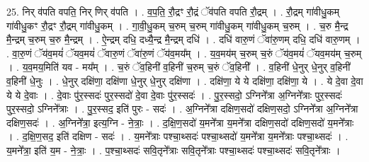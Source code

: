 \documentclass[17pt]{extarticle}
\begin{document}
25. निर् व॑पति वपति॒ निर् णिर् व॑पति । . व॒प॒ति॒ रौ॒द्रꣳ रौ॒द्रं ॅव॑पति वपति रौ॒द्रम् । . रौ॒द्रम् गा॑वीधु॒कम् गा॑वीधु॒कꣳ रौ॒द्रꣳ रौ॒द्रम् गा॑वीधु॒कम् । . गा॒वी॒धु॒कम् च॒रुम् च॒रुम् गा॑वीधु॒कम् गा॑वीधु॒कम् च॒रुम् । . च॒रु मै॒न्द्र मै॒न्द्रम् च॒रुम् च॒रु मै॒न्द्रम् । . ऐ॒न्द्रम् दधि॒ दध्यै॒न्द्र मै॒न्द्रम् दधि॑ । . दधि॑ वारु॒णं ॅवा॑रु॒णम् दधि॒ दधि॑ वारु॒णम् । . वा॒रु॒णं ॅय॑व॒मयं॑ ॅयव॒मयं॑ ॅवारु॒णं ॅवा॑रु॒णं ॅय॑व॒मय᳚म् । . य॒व॒मय॑म् च॒रुम् च॒रुं ॅय॑व॒मयं॑ ॅयव॒मय॑म् च॒रुम् । . य॒व॒मय॒मिति॑ यव - मय᳚म् । . च॒रुं ॅव॒हिनी॑ व॒हिनी॑ च॒रुम् च॒रुं ॅव॒हिनी᳚ । . व॒हिनी॑ धे॒नुर् धे॒नुर् व॒हिनी॑ व॒हिनी॑ धे॒नुः । . धे॒नुर् दक्षि॑णा॒ दक्षि॑णा धे॒नुर् धे॒नुर् दक्षि॑णा । . दक्षि॑णा॒ ये ये दक्षि॑णा॒ दक्षि॑णा॒ ये । . ये दे॒वा दे॒वा ये ये दे॒वाः । . दे॒वाः पु॑र॒स्सदः॑ पुर॒स्सदो॑ दे॒वा दे॒वाः पु॑र॒स्सदः॑ । . पु॒र॒स्सदो॒ ऽग्निने᳚त्रा अ॒ग्निने᳚त्राः पुर॒स्सदः॑ पुर॒स्सदो॒ ऽग्निने᳚त्राः । . पु॒र॒स्सद॒ इति॑ पुरः - सदः॑ । . अ॒ग्निने᳚त्रा दक्षिण॒सदो॑ दक्षिण॒सदो॒ ऽग्निने᳚त्रा अ॒ग्निने᳚त्रा दक्षिण॒सदः॑ । . अ॒ग्निने᳚त्रा॒ इत्य॒ग्नि - ने॒त्राः॒ । . द॒क्षि॒ण॒सदो॑ य॒मने᳚त्रा य॒मने᳚त्रा दक्षिण॒सदो॑ दक्षिण॒सदो॑ य॒मने᳚त्राः । . द॒क्षि॒ण॒सद॒ इति॑ दक्षिण - सदः॑ । . य॒मने᳚त्राः पश्चा॒थ्सदः॑ पश्चा॒थ्सदो॑ य॒मने᳚त्रा य॒मने᳚त्राः पश्चा॒थ्सदः॑ । . य॒मने᳚त्रा॒ इति॑ य॒म - ने॒त्राः॒ । . प॒श्चा॒थ्सदः॑ सवि॒तृने᳚त्राः सवि॒तृने᳚त्राः पश्चा॒थ्सदः॑ पश्चा॒थ्सदः॑ सवि॒तृने᳚त्राः । \newline
\end{document}
